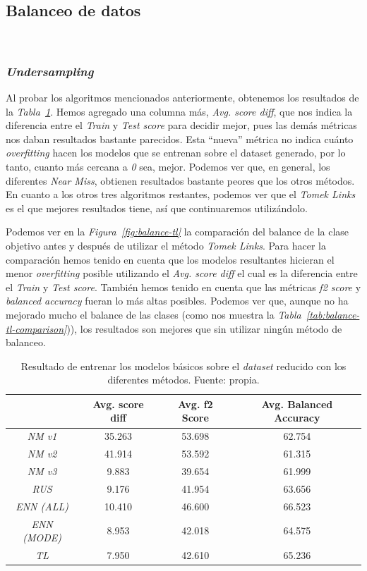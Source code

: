 \subsection{Balanceo de datos}\ \label{sec:i2-balance}

\subsubsection{\textit{Undersampling}}

Al probar los algoritmos mencionados anteriormente, obtenemos los resultados de la \textit{Tabla\ \ref{tab:undersampling-methods}}. 
Hemos agregado una columna más, \textit{Avg. score diff}, que nos indica la diferencia entre el \textit{Train} y \textit{Test score} para decidir mejor, pues las demás métricas nos daban resultados bastante parecidos. Esta ``nueva'' métrica no indica cuánto \textit{overfitting} hacen los modelos que se entrenan sobre el dataset generado, por lo tanto, cuanto más cercana a \textit{0} sea, mejor. Podemos ver que, en general, los diferentes \textit{Near Miss}, obtienen resultados bastante peores que los otros métodos. En cuanto a los otros tres algoritmos restantes, podemos ver que el \textit{Tomek Links} es el que mejores resultados tiene, así que continuaremos utilizándolo.

Podemos ver en la \textit{Figura\ \ref{fig:balance-tl}} la comparación del balance de la clase objetivo antes y después de utilizar el método \textit{Tomek Links}. Para hacer la comparación hemos tenido en cuenta que los modelos resultantes hicieran el menor \textit{overfitting} posible utilizando el \textit{Avg. score diff} el cual es la diferencia entre el \textit{Train} y \textit{Test score}. También hemos tenido en cuenta que las métricas \textit{f2 score} y \textit{balanced accuracy} fueran lo más altas posibles. Podemos ver que, aunque no ha mejorado mucho el balance de las clases (como nos muestra la \textit{Tabla\ \ref{tab:balance-tl-comparison}})), los resultados son mejores que sin utilizar ningún método de balanceo.

\begin{table}[!ht]
    \centering
    \begin{tabular}{|c|ccc|} \hline
        & Avg. score diff & Avg. f2 Score & Avg. Balanced Accuracy \\ \hline
        \textit{NM v1} & 35.263 & 53.698 & 62.754 \\
        \textit{NM v2} & 41.914 & 53.592 & 61.315 \\
        \textit{NM v3} & 9.883 & 39.654 & 61.999 \\
        \textit{RUS} & 9.176 & 41.954 & 63.656 \\
        \textit{ENN (ALL)} & 10.410 & 46.600 & 66.523 \\
        \textit{ENN (MODE)} & 8.953 & 42.018 & 64.575 \\
        \textit{TL} & 7.950 & 42.610 & 65.236 \\ \hline
    \end{tabular}
    \caption{Resultado de entrenar los modelos básicos sobre el \textit{dataset} reducido con los diferentes métodos. Fuente: propia.}\ \label{tab:undersampling-methods}
\end{table}

